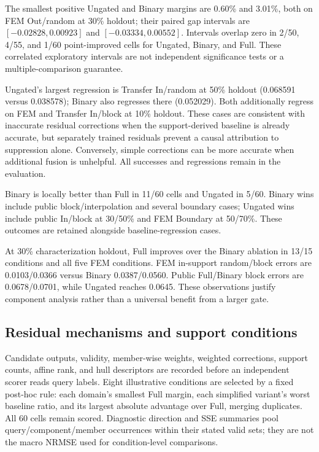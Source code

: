 \documentclass[conference,9pt,letterpaper]{IEEEtran}
\begin{document}

The smallest positive Ungated and Binary margins are 0.60\% and 3.01\%,
both on FEM Out/random at 30\% holdout; their paired gap intervals are
$[-0.02828,0.00923]$ and $[-0.03334,0.00552]$. Intervals overlap zero in
2/50, 4/55, and 1/60 point-improved cells for Ungated, Binary, and Full.
These correlated exploratory intervals are not independent significance
tests or a multiple-comparison guarantee.

Ungated's largest regression is Transfer In/random at 50\% holdout
(0.068591 versus 0.038578); Binary also regresses there (0.052029).
Both additionally regress on FEM and Transfer In/block at 10\% holdout.
These cases are consistent with inaccurate residual corrections when the
support-derived baseline is already accurate, but separately trained
residuals prevent a causal attribution to suppression alone. Conversely,
simple corrections can be more accurate when additional fusion is
unhelpful. All successes and regressions remain in the evaluation.

Binary is locally better than Full in 11/60 cells and Ungated in 5/60.
Binary wins include public block/interpolation and several boundary cases;
Ungated wins include public In/block at 30/50\% and FEM Boundary at
50/70\%. These outcomes are retained alongside baseline-regression cases.

At 30\% characterization holdout, Full improves over the Binary ablation in 13/15 conditions and all five FEM conditions. FEM in-support random/block errors are 0.0103/0.0366 versus Binary 0.0387/0.0560. Public Full/Binary block errors are 0.0678/0.0701, while Ungated reaches 0.0645. These observations justify component analysis rather than a universal benefit from a larger gate.

\subsection{Residual mechanisms and support conditions}
Candidate outputs, validity, member-wise weights, weighted corrections,
support counts, affine rank, and hull descriptors are recorded before an
independent scorer reads query labels. Eight illustrative conditions are
selected by a fixed post-hoc rule: each domain's smallest Full margin,
each simplified variant's worst baseline ratio, and its largest absolute
advantage over Full, merging duplicates. All 60 cells remain scored.
Diagnostic direction and SSE summaries pool query/component/member
occurrences within their stated valid sets; they are not the macro NRMSE
used for condition-level comparisons.
\end{document}
